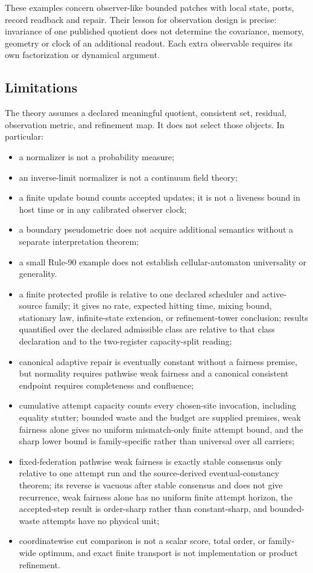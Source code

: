 \documentclass[11pt]{article}
\theoremstyle{definition}
\theoremstyle{remark}
\numberwithin{equation}{section}
\begin{document}
These examples concern observer-like bounded patches with local state,
ports, record readback and repair. Their lesson for observation design is
precise: invariance of one published quotient does not determine the
covariance, memory, geometry or clock of an additional readout. Each extra
observable requires its own factorization or dynamical argument.

\subsection{Limitations}

The theory assumes a declared meaningful quotient, consistent set, residual, observation metric, and refinement map.  It does not select those objects.  In particular:
\begin{itemize}
\item a normalizer is not a probability measure;
\item an inverse-limit normalizer is not a continuum field theory;
\item a finite update bound counts accepted updates; it is not a liveness
      bound in host time or in any calibrated observer clock;
\item a boundary pseudometric does not acquire additional semantics without a separate interpretation theorem;
\item a small Rule-90 example does not establish cellular-automaton universality or generality.
\item a finite protected profile is relative to one declared scheduler and
      active-source family; it gives no rate, expected hitting time, mixing
      bound, stationary law, infinite-state extension, or refinement-tower
      conclusion; results quantified over the declared admissible class are
      relative to that class declaration and to the two-register
      capacity-split reading;
\item canonical adaptive repair is eventually constant without a fairness
      premise, but normality requires pathwise weak fairness and a
      canonical consistent endpoint requires completeness and
      confluence;
\item cumulative attempt capacity counts every chosen-site invocation,
      including equality stutter; bounded waste and the budget are supplied
      premises, weak fairness alone gives no uniform mismatch-only finite attempt bound, and the
      sharp lower bound is family-specific rather than universal over all
      carriers;
\item fixed-federation pathwise weak fairness is exactly stable consensus only
      relative to one attempt run and the source-derived eventual-constancy
      theorem; its reverse is vacuous after stable consensus and does not give
      recurrence, weak fairness alone has no uniform finite attempt horizon,
      the accepted-step result is order-sharp rather than constant-sharp, and
      bounded-waste attempts have no physical unit;
\item coordinatewise cut comparison is not a scalar score, total order, or
      family-wide optimum, and exact finite transport is not implementation or
      product refinement.
\end{itemize}
\end{document}

